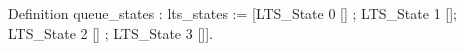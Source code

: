 Definition queue_states : lts_states := 
  [LTS_State 0 [] ; LTS_State 1 []; LTS_State 2 [] ; LTS_State 3 []].